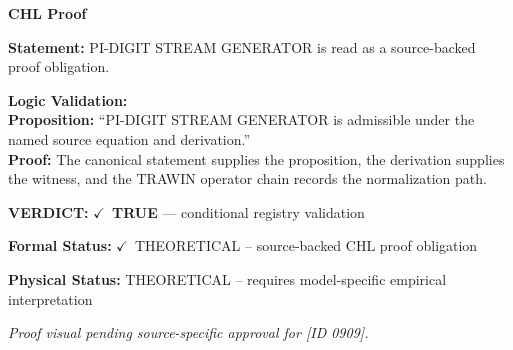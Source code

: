 \vspace{0.45em}
\noindent\textbf{CHL Proof}\par
\textbf{Statement:} PI-DIGIT STREAM GENERATOR is read as a source-backed proof obligation.

\textbf{Logic Validation:}\\
\textbf{Proposition:} ``PI-DIGIT STREAM GENERATOR is admissible under the named source equation and derivation.''\\
\textbf{Proof:} The canonical statement supplies the proposition, the derivation supplies the witness, and the TRAWIN operator chain records the normalization path.

\textbf{VERDICT:} \ensuremath{\checkmark}\ \textbf{TRUE} --- conditional registry validation

\textbf{Formal Status:} \ensuremath{\checkmark}\ THEORETICAL -- source-backed CHL proof obligation

\textbf{Physical Status:} THEORETICAL -- requires model-specific empirical interpretation
\par\vspace{0.45em}
\par
\vfill
\begingroup\footnotesize\itshape
Proof visual pending source-specific approval for [ID 0909].
\par\endgroup
\vfill
\endgroup
\endgroup

